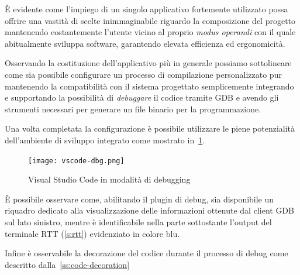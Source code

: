 È evidente come l'impiego di un singolo applicativo fortemente utilizzato possa offrire una vastità di scelte inimmaginabile riguardo la composizione del progetto mantenendo costantemente l'utente vicino al proprio \textit{modus operandi} con il quale abitualmente sviluppa software, garantendo elevata efficienza ed ergonomicità.

Osservando la costituzione dell'applicativo più in generale possiamo sottolineare come sia possibile configurare un processo di compilazione personalizzato pur mantenendo la compatibilità con il sistema progettato semplicemente integrando e supportando la possibilità di \textit{debuggare} il codice tramite GDB e avendo gli strumenti necessari per generare un file binario per la programmazione. 

Una volta completata la configurazione è possibile utilizzare le piene potenzialità dell'ambiente di sviluppo integrato come mostrato in~\cref{fig:vscode-debug}.

\begin{figure}
    \centering
    \texttt{[image: vscode-dbg.png]}
    \caption[Immagine del software Visual Studio Code]{Visual Studio Code in modalità di debugging}\label{fig:vscode-debug}
\end{figure}

È possibile osservare come, abilitando il plugin di debug, sia disponibile un riquadro dedicato alla visualizzazione delle informazioni ottenute dal client GDB sul lato sinistro, mentre è identificabile nella parte sottostante l'output del terminale RTT (\cref{s:rtt}) evidenziato in colore blu.

Infine è osservabile la decorazione del codice durante il processo di debug come descritto dalla~\cref{ss:code-decoration}